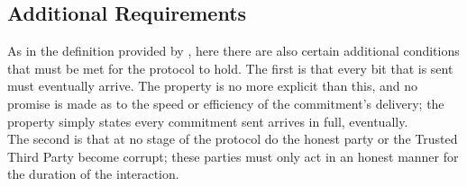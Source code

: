\documentclass{l4proj}
\begin{document}
\subsection{Additional Requirements}
As in the definition provided by \cite{chadha2001inductive}, here there are also certain additional conditions that must be met for the protocol to hold. The first is that every bit that is sent must eventually arrive. The property is no more explicit than this, and no promise is made as to the speed or efficiency of the commitment's delivery; the property simply states every commitment sent arrives in full, eventually.\\
The second is that at no stage of the protocol do the honest party or the Trusted Third Party become corrupt; these parties must only act in an honest manner for the duration of the interaction.


\end{document}
